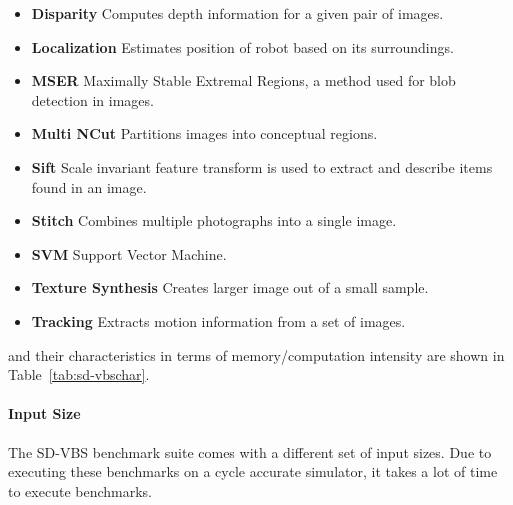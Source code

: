 \begin{itemize}
\item \textbf{Disparity} Computes depth information for a given pair of images.
\vspace{-1em}
\item \textbf{Localization} Estimates position of robot based on its surroundings.
\vspace{-1em}
\item \textbf{MSER} Maximally Stable Extremal Regions, a method used for blob detection in images.
\vspace{-1em}
\item \textbf{Multi NCut} Partitions images into conceptual regions.
\vspace{-1em}
\item \textbf{Sift} Scale invariant feature transform is used to extract and describe items found in an image.
\vspace{-1em}
\item \textbf{Stitch} Combines multiple photographs into a single image.
\vspace{-1em}
\item \textbf{SVM} Support Vector Machine.
\vspace{-1em}
\item \textbf{Texture Synthesis} Creates larger image out of a small sample.
\vspace{-1em}
\item \textbf{Tracking} Extracts motion information from a set of images.
\end{itemize}

and their characteristics in terms of memory/computation intensity are shown in Table~\ref{tab:sd-vbschar}.

\paragraph{Input Size}

The SD-VBS benchmark suite comes with a different set of input sizes.
Due to executing these benchmarks on a cycle accurate simulator, it takes a lot of time to execute benchmarks.




